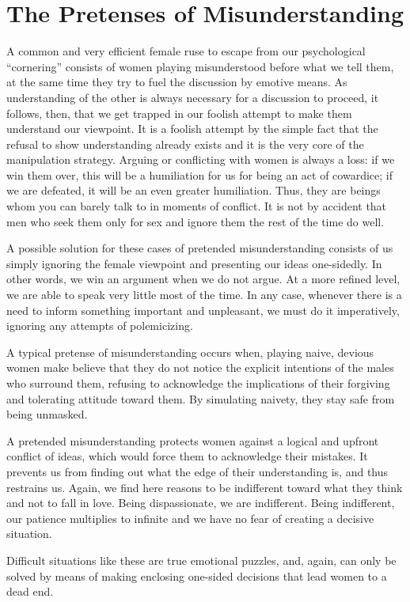 \section{The Pretenses of Misunderstanding}

\par A common and very efficient female ruse to escape from our psychological \enquote{cornering} consists of women playing misunderstood before what we tell them, at the same time they try to fuel the discussion by emotive means. As understanding of the other is always necessary for a discussion to proceed, it follows, then, that we get trapped in our foolish attempt to make them understand our viewpoint. It is a foolish attempt by the simple fact that the refusal to show understanding already exists and it is the very core of the manipulation strategy. Arguing or conflicting with women is always a loss: if we win them over, this will be a humiliation for us for being an act of cowardice; if we are defeated, it will be an even greater humiliation. Thus, they are beings whom you can barely talk to in moments of conflict. It is not by accident that men who seek them only for sex and ignore them the rest of the time do well.

\par A possible solution for these cases of pretended misunderstanding consists of us simply ignoring the female viewpoint and presenting our ideas one-sidedly. In other words, we win an argument when we do not argue. At a more refined level, we are able to speak very little most of the time. In any case, whenever there is a need to inform something important and unpleasant, we must do it imperatively, ignoring any attempts of polemicizing.

\par A typical pretense of misunderstanding occurs when, playing naive, devious women make believe that they do not notice the explicit intentions of the males who surround them, refusing to acknowledge the implications of their forgiving and tolerating attitude toward them\footnotemark[10]. By simulating naivety, they stay safe from being unmasked.


\par A pretended misunderstanding protects women against a logical and upfront conflict of ideas, which would force them to acknowledge their mistakes. It prevents us from finding out what the edge of their understanding is, and thus restrains us. Again, we find here reasons to be indifferent toward what they think and not to fall in love. Being dispassionate, we are indifferent. Being indifferent, our patience multiplies to infinite and we have no fear of creating a decisive situation.

\par Difficult situations like these are true emotional puzzles, and, again, can only be solved by means of making enclosing one-sided decisions that lead women to a dead end.